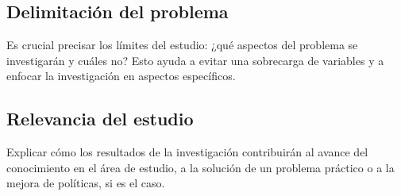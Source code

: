 \subsection{Delimitación del problema}
Es crucial precisar los límites del estudio: ¿qué aspectos del
problema se investigarán y cuáles no? Esto ayuda a evitar una
sobrecarga de variables y a enfocar la investigación en aspectos
específicos.

\subsection{Relevancia del estudio}
Explicar cómo los resultados de la investigación contribuirán al
avance del conocimiento en el área de estudio, a la solución de un
problema práctico o a la mejora de políticas, si es el caso.
